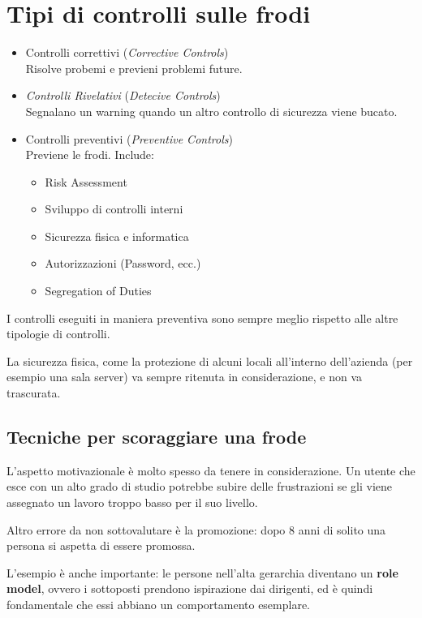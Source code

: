 \section{Tipi di controlli sulle frodi}

\begin{itemize}
\item Controlli correttivi (\emph{Corrective Controls}) \\
Risolve probemi e previeni problemi future.
\item \emph{Controlli Rivelativi} (\emph{Detecive Controls})\\
Segnalano un warning quando un altro controllo di sicurezza viene bucato.
\item Controlli preventivi (\emph{Preventive Controls})\\
Previene le frodi.
Include:
	\begin{itemize}
	\item Risk Assessment
	\item Sviluppo di controlli interni
	\item Sicurezza fisica e informatica
	\item Autorizzazioni (Password, ecc.)
	\item Segregation of Duties
	\end{itemize}
\end{itemize}

I controlli eseguiti in maniera preventiva sono sempre meglio rispetto alle
altre tipologie di controlli.

La sicurezza fisica, come la protezione di alcuni locali all'interno
dell'azienda (per esempio una sala server) va sempre ritenuta in
considerazione, e non va trascurata.

\subsection{Tecniche per scoraggiare una frode}

L'aspetto motivazionale è molto spesso da tenere in considerazione.
Un utente che esce con un alto grado di studio potrebbe subire delle
frustrazioni se gli viene assegnato un lavoro troppo basso per il suo livello.

Altro errore da non sottovalutare è la promozione: dopo 8 anni di solito una
persona si aspetta di essere promossa.

L'esempio è anche importante: le persone nell'alta gerarchia diventano un
\textbf{role model}, ovvero i sottoposti prendono ispirazione dai dirigenti, ed è
quindi fondamentale che essi abbiano un comportamento esemplare.

